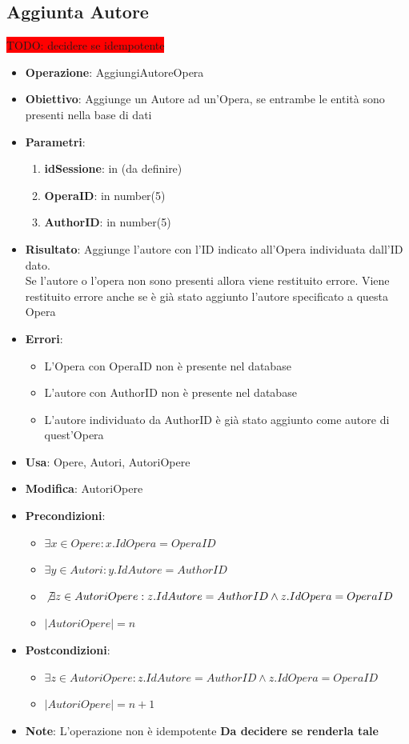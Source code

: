 \documentclass[a4paper,11pt]{article}
\begin{document}
\subsection{Aggiunta Autore} \large \colorbox{red}{TODO: decidere se idempotente}
\begin{itemize}
	\item \textbf{Operazione}: AggiungiAutoreOpera
	\item \textbf{Obiettivo}: Aggiunge un Autore ad un'Opera, se entrambe le entità sono presenti nella base di dati
	\item \textbf{Parametri}:
	\begin{enumerate}
		\item \textbf{idSessione}: in (da definire)
		\item \textbf{OperaID}: in number(5)
		\item \textbf{AuthorID}: in number(5)
	\end{enumerate}
	\item \textbf{Risultato}: Aggiunge l'autore con l'ID indicato all'Opera individuata dall'ID dato.\\
	Se l'autore o l'opera non sono presenti allora viene restituito errore.	Viene restituito errore anche se è già stato aggiunto l'autore specificato a questa Opera
	\item \textbf{Errori}: 
	\begin{itemize}
		\item L'Opera con OperaID non è presente nel database
		\item L'autore con AuthorID non è presente nel database
		\item L'autore individuato da AuthorID è già stato aggiunto come autore di quest'Opera
	\end{itemize}
	\item \textbf{Usa}: Opere, Autori, AutoriOpere
	\item \textbf{Modifica}: AutoriOpere
	\item \textbf{Precondizioni}:
	\begin{itemize}
		\item $\exists x \in Opere : x.IdOpera = OperaID$
		\item $\exists y \in Autori : y.IdAutore = AuthorID$
		\item $\not\exists z \in AutoriOpere : z.IdAutore = AuthorID \land z.IdOpera = OperaID$
		\item $|AutoriOpere| = n$
	\end{itemize}
	\item \textbf{Postcondizioni}:
	\begin{itemize}
		\item $\exists z \in AutoriOpere : z.IdAutore = AuthorID \land z.IdOpera = OperaID$
		\item $|AutoriOpere| = n + 1$
	\end{itemize}
	\item \textbf{Note}: L'operazione non è idempotente \textbf{\color{red} Da decidere se renderla tale}
\end{itemize}
\end{document}
